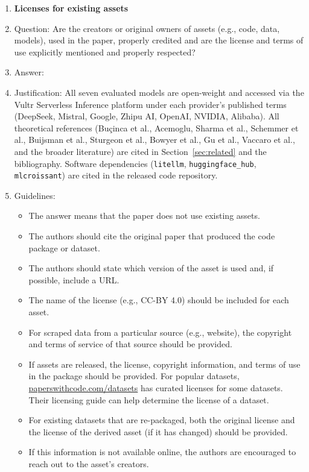 \begin{enumerate}
\item {\bf Licenses for existing assets}
    \item[] Question: Are the creators or original owners of assets (e.g., code, data, models), used in the paper, properly credited and are the license and terms of use explicitly mentioned and properly respected?
    \item[] Answer: \answerYes{}
    \item[] Justification: All seven evaluated models are open-weight and accessed via the Vultr Serverless Inference platform under each provider's published terms (DeepSeek, Mistral, Google, Zhipu AI, OpenAI, NVIDIA, Alibaba). All theoretical references (Buçinca et al., Acemoglu, Sharma et al., Schemmer et al., Buijsman et al., Sturgeon et al., Bowyer et al., Gu et al., Vaccaro et al., and the broader literature) are cited in Section~\ref{sec:related} and the bibliography. Software dependencies (\texttt{litellm}, \texttt{huggingface\_hub}, \texttt{mlcroissant}) are cited in the released code repository.
    \item[] Guidelines:
    \begin{itemize}
        \item The answer \answerNA{} means that the paper does not use existing assets.
        \item The authors should cite the original paper that produced the code package or dataset.
        \item The authors should state which version of the asset is used and, if possible, include a URL.
        \item The name of the license (e.g., CC-BY 4.0) should be included for each asset.
        \item For scraped data from a particular source (e.g., website), the copyright and terms of service of that source should be provided.
        \item If assets are released, the license, copyright information, and terms of use in the package should be provided. For popular datasets, \url{paperswithcode.com/datasets} has curated licenses for some datasets. Their licensing guide can help determine the license of a dataset.
        \item For existing datasets that are re-packaged, both the original license and the license of the derived asset (if it has changed) should be provided.
        \item If this information is not available online, the authors are encouraged to reach out to the asset's creators.
    \end{itemize}


\end{enumerate}
